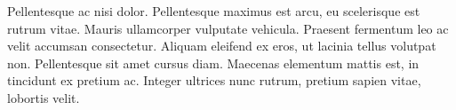 \documentclass[10pt, a4paper, twocolumn, utf8]{article}
\begin{document}
Pellentesque ac nisi dolor. Pellentesque maximus est arcu, eu scelerisque est rutrum vitae. Mauris ullamcorper vulputate vehicula. Praesent fermentum leo ac velit accumsan consectetur. Aliquam eleifend ex eros, ut lacinia tellus volutpat non. Pellentesque sit amet cursus diam. Maecenas elementum mattis est, in tincidunt ex pretium ac. Integer ultrices nunc rutrum, pretium sapien vitae, lobortis velit.


\printbibliography[title={Bibliography}] %

\end{document}
